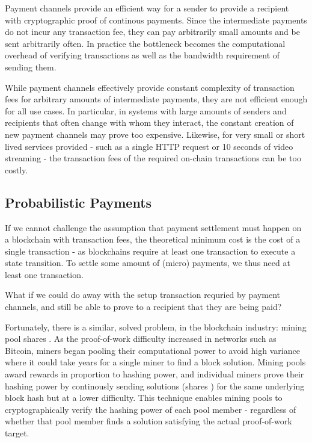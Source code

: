 Payment channels provide an efficient way for a sender to provide a recipient with cryptographic proof of continous payments. Since the intermediate payments do not incur any transaction fee, they can pay arbitrarily small amounts and be sent arbitrarily often. In practice the bottleneck becomes the computational overhead of verifying transactions as well as the bandwidth requirement of sending them.

While payment channels effectively provide constant complexity of transaction fees for arbitrary amounts of intermediate payments, they are not efficient enough for all use cases. In particular, in systems  with large amounts of senders and recipients that often change with whom they interact, the constant creation of new payment channels may prove too expensive. Likewise, for very small or short lived services provided - such as a single HTTP request or 10 seconds of video streaming - the transaction fees of the required on-chain transactions can be too costly.

\subsection{Probabilistic Payments}

If we cannot challenge the assumption that payment settlement must happen on a blockchain with transaction fees, the theoretical minimum cost is the cost of a single transaction - as blockchains require at least one transaction to execute a state transition. To settle some amount of (micro) payments, we thus need at least one transaction.

What if we could do away with the setup transaction requried by payment channels, and still be able to prove to a recipient that they are being paid?

Fortunately, there is a similar, solved problem, in the blockchain industry: mining pool shares \cite{MiningPoolMethods}. As the proof-of-work difficulty increased in networks such as Bitcoin, miners began pooling their computational power to avoid high variance where it could take years for a single miner to find a block solution. Mining pools award rewards in proportion to hashing power, and individual miners prove their hashing power by continously sending solutions (shares \cite{MiningPoolShares}) for the same underlying block hash but at a lower difficulty. This technique enables mining pools to cryptographically verify the hashing power of each pool member - regardless of whether that pool member finds a solution satisfying the actual proof-of-work target.


